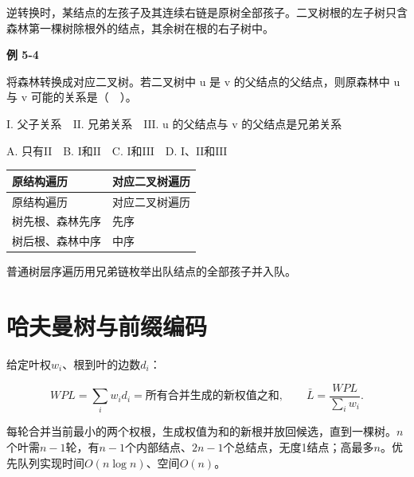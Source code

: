 逆转换时，某结点的左孩子及其连续右链是原树全部孩子。二叉树根的左子树只含森林第一棵树除根外的结点，其余树在根的右子树中。

\par\medskip{}\noindent\hypertarget{DS05-E04}{}\label{DS05-E04}\textbf{例 5-4}\par\nobreak\smallskip

将森林转换成对应二叉树。若二叉树中 u 是 v 的父结点的父结点，则原森林中 u 与 v 可能的关系是（　）。

\ensuremath{\mathrm{I}}. 父子关系　\ensuremath{\mathrm{II}}. 兄弟关系　\ensuremath{\mathrm{III}}. u 的父结点与 v 的父结点是兄弟关系

A. 只有\ensuremath{\mathrm{II}}　B. \ensuremath{\mathrm{I}}和\ensuremath{\mathrm{II}}　C. \ensuremath{\mathrm{I}}和\ensuremath{\mathrm{III}}　D. \ensuremath{\mathrm{I}}、\ensuremath{\mathrm{II}}和\ensuremath{\mathrm{III}}

\par\smallskip
{\fontsize{9.3}{12}\selectfont\setlength{\tabcolsep}{2.5pt}\setlength{\LTleft}{0pt}\setlength{\LTright}{0pt}
\begin{longtable}{@{}>{\raggedright\arraybackslash}p{}>{\raggedright\arraybackslash}p{}@{}}
\toprule
原结构遍历 & 对应二叉树遍历 \\

\midrule\endfirsthead\toprule
原结构遍历 & 对应二叉树遍历 \\

\midrule\endhead\bottomrule\endfoot
树先根、森林先序 & 先序 \\

树后根、森林中序 & 中序 \\

\end{longtable}}
\par\smallskip

普通树层序遍历用兄弟链枚举出队结点的全部孩子并入队。

\section{哈夫曼树与前缀编码}\label{DS05-huffman}

给定叶权\(w_i\)、根到叶的边数\(d_i\)：

\[WPL=\sum_iw_id_i=\text{所有合并生成的新权值之和},\qquad \bar L=\frac{WPL}{\sum_iw_i}.\]

每轮合并当前最小的两个权根，生成权值为和的新根并放回候选，直到一棵树。\(n\)个叶需\(n-1\)轮，有\(n-1\)个内部结点、\(2n-1\)个总结点，无度1结点；高最多\(n\)。优先队列实现时间\(O(n\log n)\)、空间\(O(n)\)。


